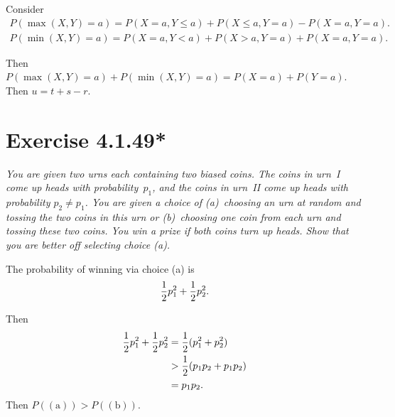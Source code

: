 \documentclass{abrice}
\begin{document}
\bigskip

Consider
\begin{align*}
  P(\max(X,Y) = a) = P(X = a, Y \leq a) + P(X \leq a, Y = a) - P(X =
  a, Y = a).\\
  P(\min(X,Y) = a) = P(X = a, Y < a) + P(X > a, Y = a) + P(X = a, Y = a).
\end{align*}

Then $P(\max(X,Y) = a) + P(\min(X,Y) = a) = P(X = a) + P(Y = a)$. Then
$u = t + s - r$.

\section{Exercise 4.1.49*}

\emph{You are given two urns each containing two biased coins.  The coins in
urn~I come up heads with probability~$p_1$, and the coins in urn~II come up
heads with probability $p_2 \ne p_1$.  You are given a choice of (a)~choosing
an urn at random and tossing the two coins in this urn or (b)~choosing one coin
from each urn and tossing these two coins.  You win a prize if both coins turn
up heads.  Show that you are better off selecting choice (a).}

\bigskip

The probability of winning via choice (a) is
\[
{1 \over 2}p_1^2 + {1 \over 2}p_2^2.
\]

Then
\begin{align*}
  {1 \over 2}p_1^2 + {1 \over 2}p_2^2
  &= {1 \over 2}(p_1^2 + p_2^2)\\
  &> {1 \over 2}(p_1 p_2 + p_1 p_2)\\
  &= p_1 p_2.
\end{align*}
Then $P(\mathrm{(a)}) > P(\mathrm{(b)})$.
\end{document}

